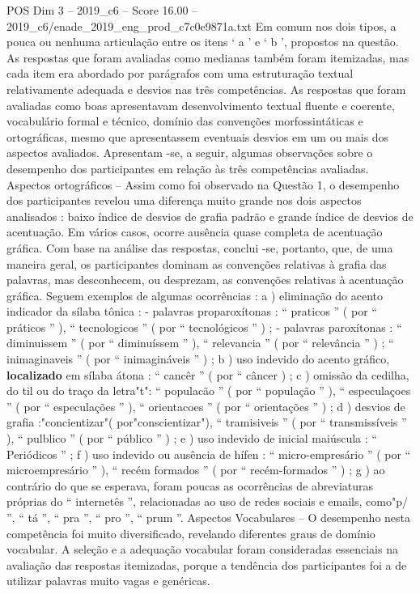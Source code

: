 \begin{textsample}{POS Dim 3 – 2019\_c6 – Score 16.00 – 2019\_c6/enade\_2019\_eng\_prod\_c7c0e9871a.txt}
Em comum nos dois tipos, a pouca ou nenhuma articulação entre os itens ‘ a ’ e ‘ b ’, propostos na questão.
As respostas que foram avaliadas como medianas também foram itemizadas, mas cada item era abordado por parágrafos com uma estruturação textual relativamente adequada e desvios nas três competências.
As respostas que foram avaliadas como boas apresentavam desenvolvimento textual fluente e coerente, vocabulário formal e técnico, domínio das convenções morfossintáticas e ortográficas, mesmo que apresentassem eventuais desvios em um ou mais dos aspectos avaliados.
Apresentam -se, a seguir, algumas observações sobre o desempenho dos participantes em relação às três competências avaliadas.
Aspectos ortográficos – Assim como foi observado na Questão 1, o desempenho dos participantes revelou uma diferença muito grande nos dois aspectos analisados : baixo índice de desvios de grafia padrão e grande índice de desvios de acentuação.
Em vários casos, ocorre ausência quase completa de acentuação gráfica.
Com base na análise das respostas, conclui -se, portanto, que, de uma maneira geral, os participantes dominam as convenções relativas à grafia das palavras, mas desconhecem, ou desprezam, as convenções relativas à acentuação gráfica.
Seguem exemplos de algumas ocorrências : a ) eliminação do acento indicador da sílaba tônica : - palavras proparoxítonas : “ praticos ” ( por “ práticos ” ), “ tecnologicos ” ( por “ tecnológicos ” ) ; - palavras paroxítonas : “ diminuissem ” ( por “ diminuíssem ” ), “ relevancia ” ( por “ relevância ” ) ; “ inimaginaveis ” ( por “ inimagináveis ” ) ; b ) uso indevido do acento gráfico, \textbf{localizado} em sílaba átona : “ cancêr ” ( por “ câncer ) ; c ) omissão da cedilha, do til ou do traço da letra"t": “ populacão ” ( por “ população ” ), “ especulaçoes ” ( por “ especulações ” ), “ orientacoes ” ( por “ orientações ” ) ; d ) desvios de grafia :"concientizar"( por"conscientizar"), “ tramisiveis ” ( por “ transmissíveis ” ), “ pulblico ” ( por “ público ” ) ; e ) uso indevido de inicial maiúscula : “ Periódicos ” ; f ) uso indevido ou ausência de hífen : “ micro-empresário ” ( por “ microempresário ” ), “ recém formados ” ( por “ recém-formados ” ) ; g ) ao contrário do que se esperava, foram poucas as ocorrências de abreviaturas próprias do “ internetês ”, relacionadas ao uso de redes sociais e emails, como"p/ ”, “ tá ”, “ pra ”, “ pro ”, “ prum ”.
Aspectos Vocabulares – O desempenho nesta competência foi muito diversificado, revelando diferentes graus de domínio vocabular.
A seleção e a adequação vocabular foram consideradas essenciais na avaliação das respostas itemizadas, porque a tendência dos participantes foi a de utilizar palavras muito vagas e genéricas.

\end{textsample}
